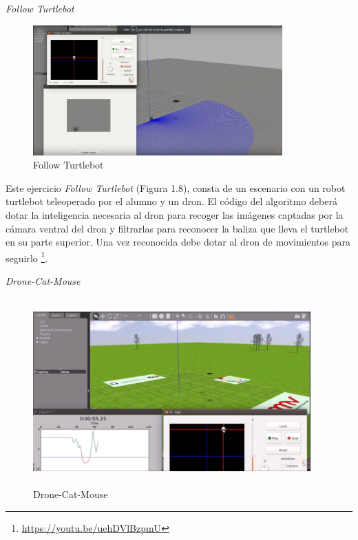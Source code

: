 \vspace{4cm}
\hspace{0.40\linewidth}
\textit{Follow Turtlebot}

\begin{figure}[H]
  \begin{center}
    \includegraphics[width=0.50\linewidth, height=5cm]{figures/followturtlebot.png}
		\caption{Follow Turtlebot}
		\label{fig.followturtlebot}
		\end{center}
\end{figure}

Este ejercicio \textit{Follow Turtlebot} (Figura 1.8), consta de un escenario con un robot turtlebot teleoperado por el alumno y un dron. El código del algoritmo deberá dotar la inteligencia necesaria al dron para recoger las imágenes captadas por la cámara ventral del dron y filtrarlas para reconocer la baliza que lleva el turtlebot en su parte superior. Una vez reconocida debe dotar al dron de movimientos para seguirlo \footnote{\url{https://youtu.be/uehDVlBzpmU}}.

\vspace{7cm}
\hspace{0.35\linewidth}
\textit{Drone-Cat-Mouse}

\begin{figure}[H]
  \begin{center}
    \includegraphics[width=0.95\textwidth, height=7.2cm]{figures/dronecatmouse.png}
		\caption{Drone-Cat-Mouse}
		\label{fig.dronecatmouse}
		\end{center}
\end{figure}

